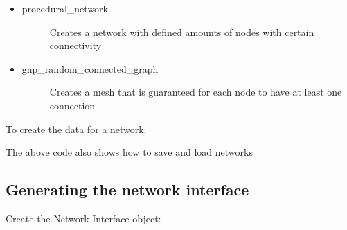 \documentclass[letterpaper,10pt,english]{sphinxmanual}
\begin{document}
\begin{itemize}
\item {} \begin{description}
\item[{procedural\_network}] \leavevmode
\sphinxAtStartPar
Creates a network with defined amounts of nodes with certain connectivity

\end{description}

\item {} \begin{description}
\item[{gnp\_random\_connected\_graph}] \leavevmode
\sphinxAtStartPar
Creates a mesh that is guaranteed for each node to have at least one connection

\end{description}

\end{itemize}

\sphinxAtStartPar
To create the data for a network:

\begin{sphinxVerbatim}[commandchars=\\\{\}]
   

  
   
\end{sphinxVerbatim}

\sphinxAtStartPar
The above code also shows how to save and load networks


\subsection{Generating the network interface}
\label{\detokenize{source/getting_started:generating-the-network-interface}}
\sphinxAtStartPar
Create the Network Interface object:

\begin{sphinxVerbatim}[commandchars=\\\{\}]
   
\end{sphinxVerbatim}
\end{document}
